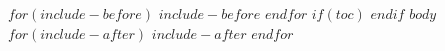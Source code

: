 \documentclass[11pt]{article}
\begin{document}
$for(include-before)$
$include-before$
$endfor$
$if(toc)$
{\hypersetup{linkcolor=black}\setcounter{tocdepth}{$toc-depth$}\tableofcontents}
\clearpage
$endif$
$body$
$for(include-after)$
$include-after$
$endfor$
\end{document}
